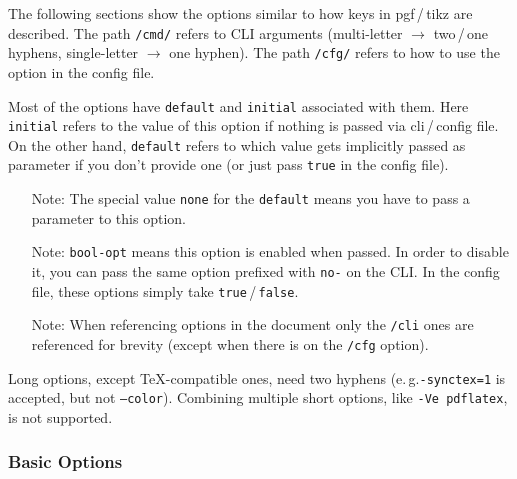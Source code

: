 \documentclass[a4paper, 11pt]{scrartcl}
\newcommand\eg{e.\,g.\xspace}
\newcommand\tos{$\to$\xspace}
\let\TeXold\TeX
\renewcommand\TeX{\TeXold\xspace}
\begin{document}
The following sections show the options similar to how keys in pgf\,/\,tikz are described.
The path \texttt{/cmd/} refers to CLI arguments (multi-letter \tos two\,/\,one hyphens, single-letter \tos one hyphen).
The path \texttt{/cfg/} refers to how to use the option in the config file.

Most of the options have \texttt{default} and \texttt{initial} associated with them.
Here \texttt{initial} refers to the value of this option if nothing is passed via cli\,/\,config file.
On the other hand, \texttt{default} refers to which value gets implicitly passed as parameter if you don't provide one (or just pass \texttt{true} in the config file).

\begin{itemize}
	\item[Note:] The special value \texttt{none} for the \texttt{default} means you have to pass a parameter to this option.
	\item[Note:] \texttt{bool-opt} means this option is enabled when passed.
		In order to disable it, you can pass the same option prefixed with \texttt{no-} on the CLI.
		In the config file, these options simply take \texttt{true}\,/\,\texttt{false}.
	\item[Note:] When referencing options in the document only the \texttt{/cli} ones are referenced for brevity (except when there is on the \texttt{/cfg} option).
\end{itemize}

Long options, except \TeX-compatible ones, need two hyphens (\eg \texttt{-synctex=1} is accepted, but not \texttt{--color}).
Combining multiple short options, like \texttt{-Ve pdflatex}, is not supported.

\subsubsection{Basic Options}
\end{document}
